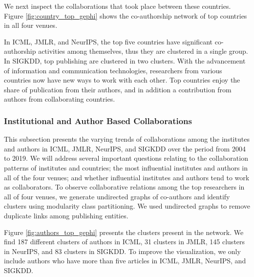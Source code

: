 We next inspect the collaborations that took place between these countries. Figure \ref{fig:country_top_gephi} shows the co-authorship network of top countries in all four venues. 

In ICML, JMLR, and NeurIPS, the top five countries have significant co-authorship activities among themselves, thus they are clustered in a single group. In SIGKDD, top publishing are clustered in two clusters. With the advancement of information and communication technologies, researchers from various countries now have new ways to work with each other. Top countries enjoy the share of publication from their authors, and in addition a contribution from authors from collaborating countries. 




\subsubsection{Institutional and Author Based Collaborations}
This subsection presents the varying trends of collaborations among the institutes and authors in ICML, JMLR, NeurIPS, and SIGKDD over the period from 2004 to 2019. We will address several important questions relating to the collaboration patterns of institutes and countries; the most influential institutes and authors in all of the four venues; and whether influential institutes and authors tend to work as collaborators. To observe collaborative relations among the top researchers in all of four venues, we generate undirected graphs of co-authors and identify clusters using modularity class partitioning. We used undirected graphs to remove duplicate links among publishing entities. 

Figure \ref{fig:authors_top_gephi} presents the clusters present in the network. We find 187 different clusters of authors in ICML, 31 clusters in JMLR, 145 clusters in NeurIPS, and 83 clusters in SIGKDD. To improve the visualization, we only include authors who have more than five articles in ICML, JMLR, NeurIPS, and SIGKDD. 


